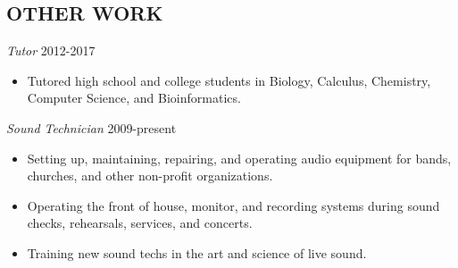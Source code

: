 \documentclass[margin, 10pt]{res} %
\begin{document}
\begin{resume}
\section{OTHER WORK}

{\sl Tutor} \hfill 2012-2017
\begin{itemize} \itemsep -2pt %
\item Tutored high school and college students in Biology, Calculus, Chemistry, Computer Science, and Bioinformatics.
\end{itemize}

{\sl Sound Technician} \hfill 2009-present
\begin{itemize} \itemsep -2pt %
\item Setting up, maintaining, repairing, and operating audio equipment for bands, churches, and other non-profit organizations.
\item Operating the front of house, monitor, and recording systems during sound checks, rehearsals, services, and concerts.
\item Training new sound techs in the art and science of live sound.
\end{itemize}

\end{resume}
\end{document}
